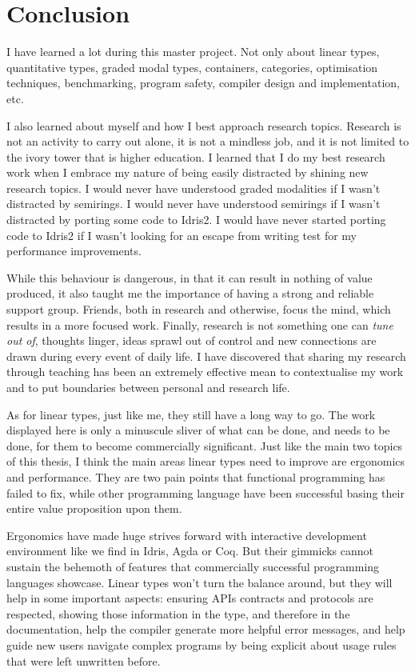 \documentclass[
]{article}
\begin{document}
\hypertarget{conclusion}{%
\section{Conclusion}\label{conclusion}}

I have learned a lot during this master project. Not only about linear
types, quantitative types, graded modal types, containers, categories,
optimisation techniques, benchmarking, program safety, compiler design
and implementation, etc.

I also learned about myself and how I best approach research topics.
Research is not an activity to carry out alone, it is not a mindless
job, and it is not limited to the ivory tower that is higher education.
I learned that I do my best research work when I embrace my nature of
being easily distracted by shining new research topics. I would never
have understood graded modalities if I wasn't distracted by semirings. I
would never have understood semirings if I wasn't distracted by porting
some code to Idris2. I would have never started porting code to Idris2
if I wasn't looking for an escape from writing test for my performance
improvements.

While this behaviour is dangerous, in that it can result in nothing of
value produced, it also taught me the importance of having a strong and
reliable support group. Friends, both in research and otherwise, focus
the mind, which results in a more focused work. Finally, research is not
something one can \emph{tune out of}, thoughts linger, ideas sprawl out
of control and new connections are drawn during every event of daily
life. I have discovered that sharing my research through teaching has
been an extremely effective mean to contextualise my work and to put
boundaries between personal and research life.

As for linear types, just like me, they still have a long way to go. The
work displayed here is only a minuscule sliver of what can be done, and
needs to be done, for them to become commercially significant. Just like
the main two topics of this thesis, I think the main areas linear types
need to improve are ergonomics and performance. They are two pain points
that functional programming has failed to fix, while other programming
language have been successful basing their entire value proposition upon
them.

Ergonomics have made huge strives forward with interactive development
environment like we find in Idris, Agda or Coq. But their gimmicks
cannot sustain the behemoth of features that commercially successful
programming languages showcase. Linear types won't turn the balance
around, but they will help in some important aspects: ensuring APIs
contracts and protocols are respected, showing those information in the
type, and therefore in the documentation, help the compiler generate
more helpful error messages, and help guide new users navigate complex
programs by being explicit about usage rules that were left unwritten
before.
\end{document}
